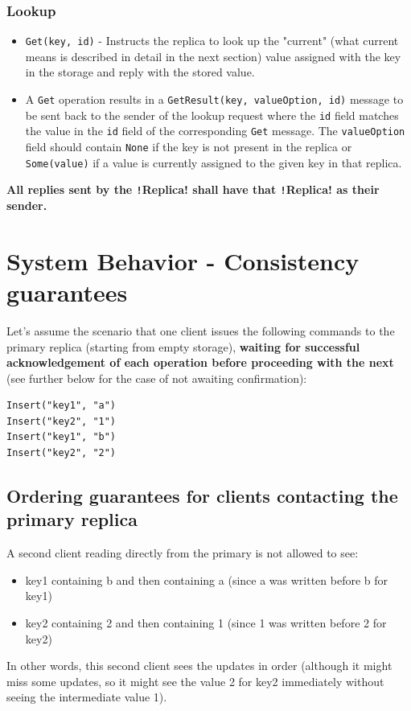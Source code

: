 \documentclass{article}
\begin{document}
 \subsubsection{Lookup} 
 \begin{itemize} 
	 \item \texttt{Get(key, id)} - Instructs the replica to look up the "current" (what current means is described in detail in the next section) value assigned with the key in the storage and reply with the stored value. 
	 \item 	 A \texttt{Get} operation results in a \texttt{GetResult(key, valueOption, id)} message to be sent back to the sender of the lookup request where the \texttt{id} field matches the value in the \texttt{id} field of the corresponding \texttt{Get} message. The \texttt{valueOption} field should contain \texttt{None} if the key is not present in the replica or \texttt{Some(value)} if a value is currently assigned to the given key in that replica. 
\end{itemize}
 \textbf{All replies sent by the \texttt!Replica! shall have that \texttt!Replica! as their sender.} 
\section{System Behavior - Consistency guarantees}\label{s:systembehavior}
Let's assume the scenario that one client issues the following commands to the primary replica (starting from empty storage), \textbf{waiting for successful acknowledgement of each operation before proceeding with the next} (see further below for the case of not awaiting confirmation): 
\begin{verbatim}
Insert("key1", "a") 
Insert("key2", "1") 
Insert("key1", "b") 
Insert("key2", "2") 
\end{verbatim}
\subsection{Ordering guarantees for clients contacting the primary replica}\label{ss:orderingguaranteesprimary}
A second client reading directly from the primary is not allowed to see: \begin{itemize} 
\item key1 containing b and then containing a (since a was written before b for key1) 
\item key2 containing 2 and then containing 1 (since 1 was written before 2 for key2) 
\end{itemize} 
In other words, this second client sees the updates in order (although it might miss some updates, so it might see the value 2 for key2 immediately without seeing the intermediate value 1).
\end{document}
